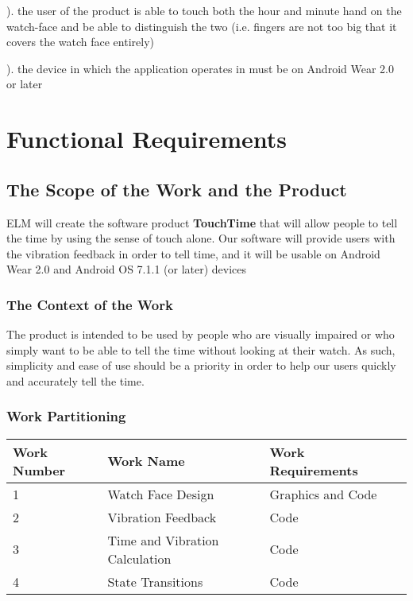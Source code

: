 \documentclass[12pt, titlepage]{article}
\begin{document}
). the user of the product is able to touch both the hour and minute hand on the watch-face and be able to distinguish the two (i.e. fingers are not too big that it covers the watch face entirely)

). the device in which the application operates in must be on Android Wear 2.0 or later

\section{Functional Requirements}

\subsection{The Scope of the Work and the Product}


ELM will create the software product \textbf{TouchTime} that will allow people to tell the time by using the sense of touch alone. Our software will provide users with the vibration feedback in order to tell time, and it will be usable on Android Wear 2.0 and Android OS 7.1.1 (or later) devices

\subsubsection{The Context of the Work}


The product is intended to be used by people who are visually impaired or who simply want to be able to tell the time without looking at their watch. As such, simplicity and ease of use should be a priority in order to help our users quickly and accurately tell the time.

\subsubsection{Work Partitioning}

\begin{center}
    \begin{tabular}{| l | l | l | p{5cm} | }
    \hline
    Work Number & Work Name & Work Requirements \\ \hline
    1 & Watch Face Design & Graphics and Code \\ \hline
    2 & Vibration Feedback & Code \\ \hline
    3 & Time and Vibration Calculation & Code \\ \hline
    4 & State Transitions & Code \\ \hline
    \end{tabular}
\end{center}
\end{document}
